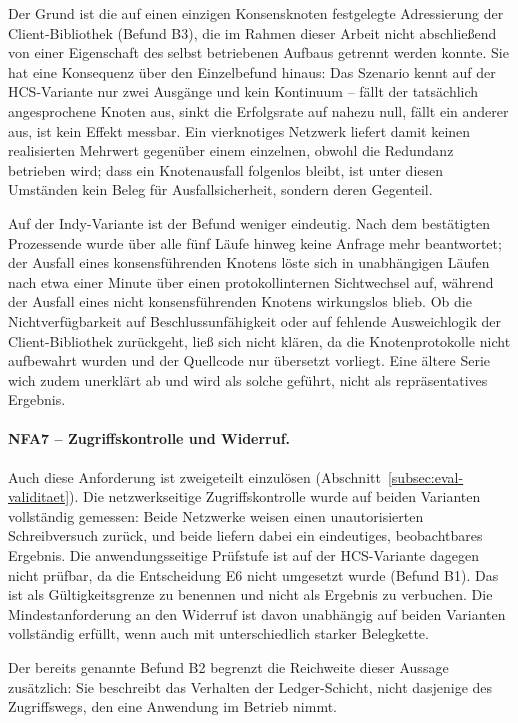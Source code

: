 Der Grund ist die auf einen einzigen Konsensknoten festgelegte Adressierung der Client-Bibliothek (Befund B3), die im Rahmen dieser Arbeit nicht abschließend von einer Eigenschaft des selbst betriebenen Aufbaus getrennt werden konnte. Sie hat eine Konsequenz über den Einzelbefund hinaus: Das Szenario kennt auf der HCS-Variante nur zwei Ausgänge und kein Kontinuum -- fällt der tatsächlich angesprochene Knoten aus, sinkt die Erfolgsrate auf nahezu null, fällt ein anderer aus, ist kein Effekt messbar. Ein vierknotiges Netzwerk liefert damit keinen realisierten Mehrwert gegenüber einem einzelnen, obwohl die Redundanz betrieben wird; dass ein Knotenausfall folgenlos bleibt, ist unter diesen Umständen kein Beleg für Ausfallsicherheit, sondern deren Gegenteil.

Auf der Indy-Variante ist der Befund weniger eindeutig. Nach dem bestätigten Prozessende wurde über alle fünf Läufe hinweg keine Anfrage mehr beantwortet; der Ausfall eines konsensführenden Knotens löste sich in unabhängigen Läufen nach etwa einer Minute über einen protokollinternen Sichtwechsel auf, während der Ausfall eines nicht konsensführenden Knotens wirkungslos blieb. Ob die Nichtverfügbarkeit auf Beschlussunfähigkeit oder auf fehlende Ausweichlogik der Client-Bibliothek zurückgeht, ließ sich nicht klären, da die Knotenprotokolle nicht aufbewahrt wurden und der Quellcode nur übersetzt vorliegt. Eine ältere Serie wich zudem unerklärt ab und wird als solche geführt, nicht als repräsentatives Ergebnis.

\paragraph{NFA7 -- Zugriffskontrolle und Widerruf.} Auch diese Anforderung ist zweigeteilt einzulösen (Abschnitt~\ref{subsec:eval-validitaet}). Die netzwerkseitige Zugriffskontrolle wurde auf beiden Varianten vollständig gemessen: Beide Netzwerke weisen einen unautorisierten Schreibversuch zurück, und beide liefern dabei ein eindeutiges, beobachtbares Ergebnis. Die anwendungsseitige Prüfstufe ist auf der HCS-Variante dagegen nicht prüfbar, da die Entscheidung E6 nicht umgesetzt wurde (Befund B1). Das ist als Gültigkeitsgrenze zu benennen und nicht als Ergebnis zu verbuchen. Die Mindestanforderung an den Widerruf ist davon unabhängig auf beiden Varianten vollständig erfüllt, wenn auch mit unterschiedlich starker Belegkette.

Der bereits genannte Befund B2 begrenzt die Reichweite dieser Aussage zusätzlich: Sie beschreibt das Verhalten der Ledger-Schicht, nicht dasjenige des Zugriffswegs, den eine Anwendung im Betrieb nimmt.

